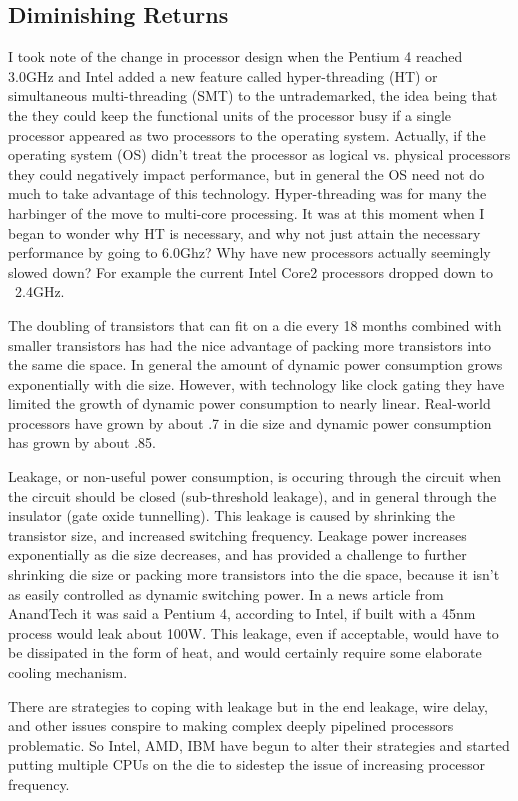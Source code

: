 \documentclass[12pt,twoside,letterpaper]{article}
\begin{document}
\subsection*{Diminishing Returns}
I took note of the change in processor design when the Pentium 4 reached 3.0GHz and Intel added a new feature called hyper-threading (HT) or simultaneous multi-threading (SMT) to the untrademarked, the idea being that the they could keep the functional units of the processor busy if a single processor appeared as two processors to the operating system. Actually, if the operating system (OS) didn't treat the processor as logical vs. physical processors they could negatively impact performance, but in general the OS need not do much to take advantage of this technology. Hyper-threading was for many the harbinger of the move to multi-core processing. It was at this moment when I began to wonder why HT is necessary, and why not just attain the necessary performance by going to 6.0Ghz? Why have new processors actually seemingly slowed down? For example the current Intel Core2 processors dropped down to ~2.4GHz.

The doubling of transistors that can fit on a die every 18 months combined with smaller transistors has had the nice advantage of packing more transistors into the same die space. In general the amount of dynamic power consumption grows exponentially with die size. However, with technology like clock gating they have limited the growth of dynamic power consumption to nearly linear. Real-world processors have grown by about .7 in die size and dynamic power consumption has grown by about .85. 

Leakage, or non-useful power consumption, is occuring through the circuit when the circuit should be closed (sub-threshold leakage), and in general through the insulator (gate oxide tunnelling). This leakage is caused by shrinking the transistor size, and increased switching frequency. Leakage power increases exponentially as die size decreases, and has provided a challenge to further shrinking die size or packing more transistors into the die space, because it isn't as easily controlled as dynamic switching power. In a news article from AnandTech it was said a Pentium 4, according to Intel, if built with a 45nm process would leak about 100W. This leakage, even if acceptable, would have to be dissipated in the form of heat, and would certainly require some elaborate cooling mechanism.

There are strategies to coping with leakage but in the end leakage, wire delay, and other issues conspire to making complex deeply pipelined processors problematic. So Intel, AMD, IBM have begun to alter their strategies and started putting multiple CPUs on the die to sidestep the issue of increasing processor frequency.
\end{document}
